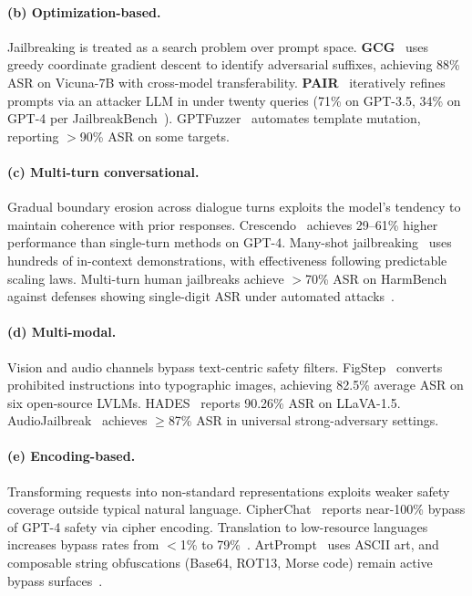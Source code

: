 \paragraph{(b) Optimization-based.}
Jailbreaking is treated as a search problem over prompt space. \textbf{GCG}~\cite{zou2023gcg} uses greedy coordinate gradient descent to identify adversarial suffixes, achieving 88\% ASR on Vicuna-7B with cross-model transferability. \textbf{PAIR}~\cite{chao2024pair} iteratively refines prompts via an attacker LLM in under twenty queries (71\% on GPT-3.5, 34\% on GPT-4 per JailbreakBench~\cite{chao2024jailbreakbench}). GPTFuzzer~\cite{yu2023gptfuzzer} automates template mutation, reporting $>$90\% ASR on some targets.

\paragraph{(c) Multi-turn conversational.}
Gradual boundary erosion across dialogue turns exploits the model's tendency to maintain coherence with prior responses. Crescendo~\cite{russinovich2025crescendo} achieves 29--61\% higher performance than single-turn methods on GPT-4. Many-shot jailbreaking~\cite{anil2024manyshot} uses hundreds of in-context demonstrations, with effectiveness following predictable scaling laws. Multi-turn human jailbreaks achieve $>$70\% ASR on HarmBench against defenses showing single-digit ASR under automated attacks~\cite{mazeika2024harmbench}.

\paragraph{(d) Multi-modal.}
Vision and audio channels bypass text-centric safety filters. FigStep~\cite{gong2025figstep} converts prohibited instructions into typographic images, achieving 82.5\% average ASR on six open-source LVLMs. HADES~\cite{li2024hades} reports 90.26\% ASR on LLaVA-1.5. AudioJailbreak~\cite{chen2025audiojailbreak} achieves $\geq$87\% ASR in universal strong-adversary settings.

\paragraph{(e) Encoding-based.}
Transforming requests into non-standard representations exploits weaker safety coverage outside typical natural language. CipherChat~\cite{yuan2024cipherchat} reports near-100\% bypass of GPT-4 safety via cipher encoding. Translation to low-resource languages increases bypass rates from $<$1\% to 79\%~\cite{yong2023lowresource,deng2024multilingual}. ArtPrompt~\cite{jiang2024artprompt} uses ASCII art, and composable string obfuscations (Base64, ROT13, Morse code) remain active bypass surfaces~\cite{huang2024plentiful}.

